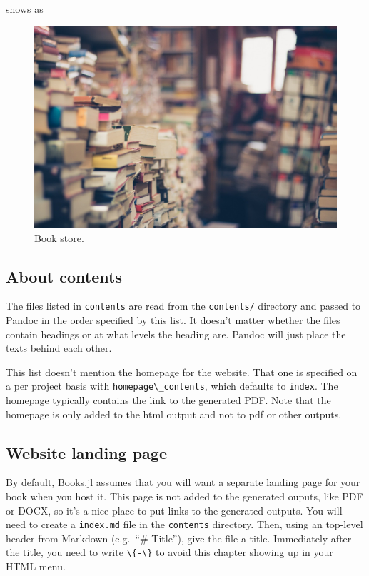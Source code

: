 \documentclass[
  notoc %
]{tufte-book}
\newcommand{\passthrough}[1]{#1}
\begin{document}
shows as

\begin{figure}
\hypertarget{fig:store}{%
\centering
\includegraphics{images/book-store.jpg}
\caption{Book store.}\label{fig:store}
}
\end{figure}

\hypertarget{sec:about_contents}{%
\subsection{About contents}\label{sec:about_contents}}

The files listed in \passthrough{\lstinline!contents!} are read from the
\passthrough{\lstinline!contents/!} directory and passed to Pandoc in
the order specified by this list. It doesn't matter whether the files
contain headings or at what levels the heading are. Pandoc will just
place the texts behind each other.

This list doesn't mention the homepage for the website. That one is
specified on a per project basis with
\passthrough{\lstinline!homepage\_contents!}, which defaults to
\passthrough{\lstinline!index!}. The homepage typically contains the
link to the generated PDF. Note that the homepage is only added to the
html output and not to pdf or other outputs.

\hypertarget{website-landing-page}{%
\subsection{Website landing page}\label{website-landing-page}}

By default, Books.jl assumes that you will want a separate landing page
for your book when you host it. This page is not added to the generated
ouputs, like PDF or DOCX, so it's a nice place to put links to the
generated outputs. You will need to create a
\passthrough{\lstinline!index.md!} file in the
\passthrough{\lstinline!contents!} directory. Then, using an top-level
header from Markdown (e.g.~``\# Title''), give the file a title.
Immediately after the title, you need to write
\passthrough{\lstinline!\{-\}!} to avoid this chapter showing up in your
HTML menu.
\end{document}
